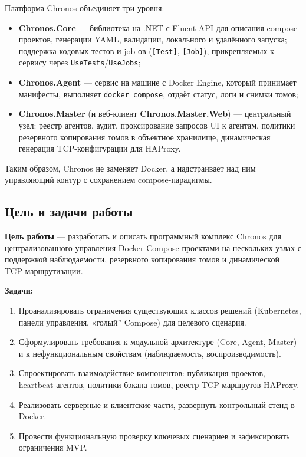 Платформа Chronos объединяет три уровня:

\begin{itemize}[leftmargin=1.5cm]
  \item \textbf{Chronos.Core} --- библиотека на .NET с Fluent API для описания compose-проектов, генерации YAML, валидации, локального и удалённого запуска; поддержка кодовых тестов и job-ов (\texttt{[Test]}, \texttt{[Job]}), прикрепляемых к сервису через \texttt{UseTests}/\texttt{UseJobs};
  \item \textbf{Chronos.Agent} --- сервис на машине с Docker Engine, который принимает манифесты, выполняет \texttt{docker compose}, отдаёт статус, логи и снимки томов;
  \item \textbf{Chronos.Master} (и веб-клиент \textbf{Chronos.Master.Web}) --- центральный узел: реестр агентов, аудит, проксирование запросов UI к агентам, политики резервного копирования томов в объектное хранилище, динамическая генерация TCP-конфигурации для HAProxy.
\end{itemize}

Таким образом, Chronos не заменяет Docker, а надстраивает над ним управляющий контур с сохранением compose-парадигмы.

\subsection{Цель и задачи работы}

\textbf{Цель работы} --- разработать и описать программный комплекс Chronos для централизованного управления Docker Compose-проектами на нескольких узлах с поддержкой наблюдаемости, резервного копирования томов и динамической TCP-маршрутизации.

\textbf{Задачи:}
\begin{enumerate}[leftmargin=1.5cm]
  \item Проанализировать ограничения существующих классов решений (Kubernetes, панели управления, «голый'' Compose) для целевого сценария.
  \item Сформулировать требования к модульной архитектуре (Core, Agent, Master) и к нефункциональным свойствам (наблюдаемость, воспроизводимость).
  \item Спроектировать взаимодействие компонентов: публикация проектов, heartbeat агентов, политики бэкапа томов, реестр TCP-маршрутов HAProxy.
  \item Реализовать серверные и клиентские части, развернуть контрольный стенд в Docker.
  \item Провести функциональную проверку ключевых сценариев и зафиксировать ограничения MVP.
\end{enumerate}

